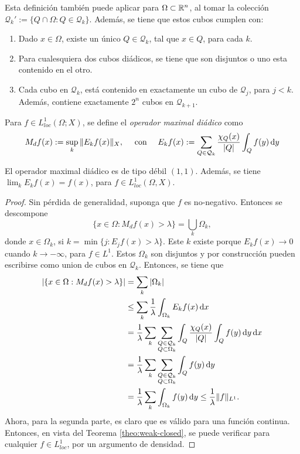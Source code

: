 \begin{remark}
	Esta definición también puede aplicar para $\Omega\subset\mathbb{R}^n$, al tomar la colección $\mathcal{Q}_k' := \{Q\cap\Omega: Q\in\mathcal{Q}_k\}$. Además, se tiene que estos cubos cumplen con:
	\begin{enumerate}
		\item Dado $x\in\Omega$, existe un único $Q\in\mathcal{Q}_k$, tal que $x\in Q$, para cada $k$. 
		\item Para cualesquiera dos cubos diádicos, se tiene que son disjuntos o uno esta contenido en el otro. 
		\item Cada cubo en $\mathcal{Q}_k$, está contenido en exactamente un cubo de $\mathcal{Q}_j$, para $j<k$. Además, contiene exactamente $2^n$ cubos en $\mathcal{Q}_{k+1}$.
	\end{enumerate}
\end{remark}
\begin{definition}
	Para $f\in L^1_{loc}(\Omega;X)$, se define el \textit{operador maximal diádico} como 
	\begin{equation*}
		M_df(x) := \sup_k \|E_kf(x)\|_X, \quad \text{ con } \quad E_kf(x) := \sum_{Q\in\mathcal{Q}_k} \frac{\chi_Q(x)}{|Q|} \int_Q f(y) \mathop{}\!\mathrm{d} y
	\end{equation*}
\end{definition}
\begin{theorem}
	El operador maximal diádico es de tipo débil $(1, 1)$. Además, se tiene $\lim_k E_k f(x) = f(x) $, para $f\in L^1_{loc}(\Omega, X)$.
\end{theorem}
\begin{proof}
	Sin pérdida de generalidad, suponga que $f$ es no-negativo. Entonces se descompone 
	\begin{equation*}
		\{x\in\Omega: M_df(x)>\lambda\} = \bigcup_k \Omega_k,
	\end{equation*}
	donde $x\in\Omega_k$, si $k = \min\{j: E_jf(x) > \lambda\}$. Este $k$ existe porque $E_kf(x)\to0$ cuando $k\to-\infty$, para $f\in L^1$. Estos $\Omega_k$ son disjuntos y por construcción pueden escribirse como union de cubos en $\mathcal{Q}_k$. Entonces, se tiene que 
	\begin{align*}
		| \{x\in\Omega: M_df(x)>\lambda\}  | & = \sum_k |\Omega_k| \\
		& \leq \sum_k \frac{1}{\lambda} \int_{\Omega_k} E_k f(x)\mathop{}\!\mathrm{d} x \\
		& = \frac{1}{\lambda} \sum_k \sum_{\substack{Q\in\mathcal{Q}_k\\ Q\subset\Omega_k}} \int_Q \frac{\chi_Q(x)}{|Q|}\int_Q f(y) \mathop{}\!\mathrm{d} y \mathop{}\!\mathrm{d} x \\
		& = \frac{1}{\lambda} \sum_k \sum_{\substack{Q\in\mathcal{Q}_k\\ Q\subset\Omega_k}} \int_Q f(y) \mathop{}\!\mathrm{d} y\\
		& = \frac{1}{\lambda} \sum_k \int_{\Omega_k} f(y)\mathop{}\!\mathrm{d} y
		\leq \frac{1}{\lambda} \|f\|_{L^1}.
	\end{align*}
	Ahora, para la segunda parte, es claro que es válido para una función continua. Entonces, en vista del Teorema \ref{theo:weak-closed}, se puede verificar para cualquier $f\in L^1_{loc}$, por un argumento de densidad.
\end{proof}
